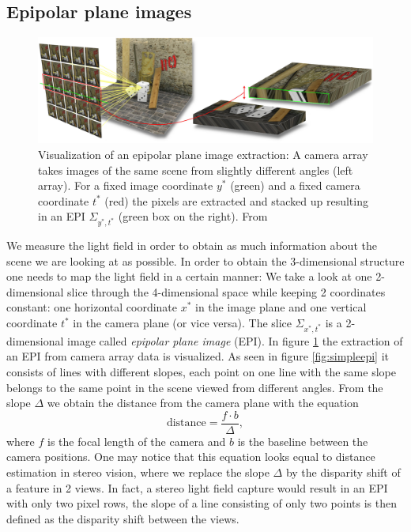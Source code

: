 \documentclass  [
  paper    = a4,
  BCOR     = 10mm,
  twoside,
  fontsize = 12pt,
  fleqn,
  toc      = bibnumbered,
  toc      = listofnumbered,
  numbers  = noendperiod,
  headings = normal,
  listof   = leveldown,
  version  = 3.03
]                                       {scrreprt}
\begin{document}
\subsection{Epipolar plane images}
\label{sec:epi}
\begin{figure}[h!]
	\centering
	\includegraphics[width=1\linewidth]{images/epiVisualization}
	\caption[Visualization of an EPI extraction]{Visualization of an epipolar plane image extraction: A camera array takes images of the same scene from slightly different angles (left array). For a fixed image coordinate $y^*$ (green) and a fixed camera coordinate $t^*$ (red) the pixels are extracted and stacked up resulting in an EPI $\Sigma_{y^*, t^*}$ (green box on the right). From\cite{iwr.uni-heidelberg.de}}
	\label{fig:epivisualization}
\end{figure}
We measure the light field in order to obtain as much information about the scene we are looking at as possible. In order to obtain the 3-dimensional structure one needs to map the light field in a certain manner: We take a look at one 2-dimensional slice through the 4-dimensional space while keeping 2 coordinates constant: one horizontal coordinate  $x^{*}$  in the image plane and one vertical coordinate $t^{*}$ in the camera plane (or vice versa). The slice $\Sigma_{x^{*}, t^{*}}$ is a 2-dimensional image called \textit{epipolar plane image} (EPI). In figure \ref{fig:epivisualization} the extraction of an EPI from camera array data is visualized. As seen in figure \ref{fig:simpleepi} it consists of lines with different slopes, each point on one line with the same slope belongs to the same point in the scene viewed from different angles. From the slope $\Delta$ we obtain the distance from the camera plane with the equation
\begin{equation}\label{eq:distance}
\text{distance} = \frac{f\cdot b}{\Delta},
\end{equation}
where $f$ is the focal length of the camera and $b$ is the baseline between the camera positions. One may notice that this equation looks equal to distance estimation in stereo vision, where we replace the slope $\Delta$ by the disparity shift of a feature in 2 views. In fact, a stereo light field capture would result in an EPI with only two pixel rows, the slope of a line consisting of only two points is then defined as the disparity shift between the views.
\end{document}

